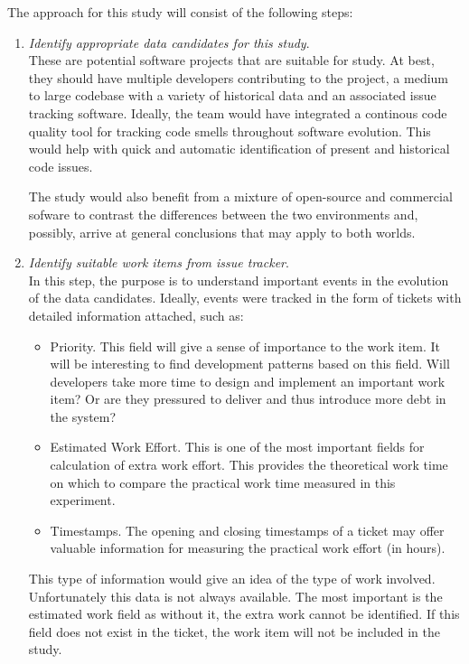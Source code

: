 \documentclass{mprop}
\begin{document}
The approach for this study will consist of the following steps:
\begin{enumerate}
	\item \textit{Identify appropriate data candidates for this study}.\\
	      These are potential software projects that are suitable for study. At best,
	      they should have multiple developers contributing to the project, a medium
	      to large codebase with a variety of historical data and an associated issue
	      tracking software. Ideally, the team would have integrated a continous code
	      quality tool for tracking code smells throughout software evolution. This
	      would help with quick and automatic identification of present and historical
	      code issues.

	      The study would also benefit from a mixture of open-source and
	      commercial sofware to contrast the differences between the two environments
	      and, possibly, arrive at general conclusions that may apply to both worlds.

	\item \textit{Identify suitable work items from issue tracker}.\\
	      In this step, the purpose is to understand important events in the evolution
	      of the data candidates. Ideally, events were tracked in the form of tickets
	      with detailed information attached, such as:
	      \begin{itemize}
		      \item Priority. This field will give a sense of importance to the
		      work item. It will be interesting to find development patterns
		      based on this field. Will developers take more time to design and
		      implement an important work item? Or are they pressured to deliver
		      and thus introduce more debt in the system?
		      \item Estimated Work Effort. This is one of the most important
		      fields for calculation of extra work effort. This provides the
		      theoretical work time on which to compare the practical work time
		      measured in this experiment.
		      \item Timestamps. The opening and closing timestamps of a ticket
		      may offer valuable information for measuring the practical work
		      effort (in hours).
	      \end{itemize}

	      This type of information would give an idea of the type of work involved.
	      Unfortunately this data is not always available. The most important is the
	      estimated work field as without it, the extra work cannot be identified. If
	      this field does not exist in the ticket, the work item will not be included
	      in the study.


\end{enumerate}
\end{document}
